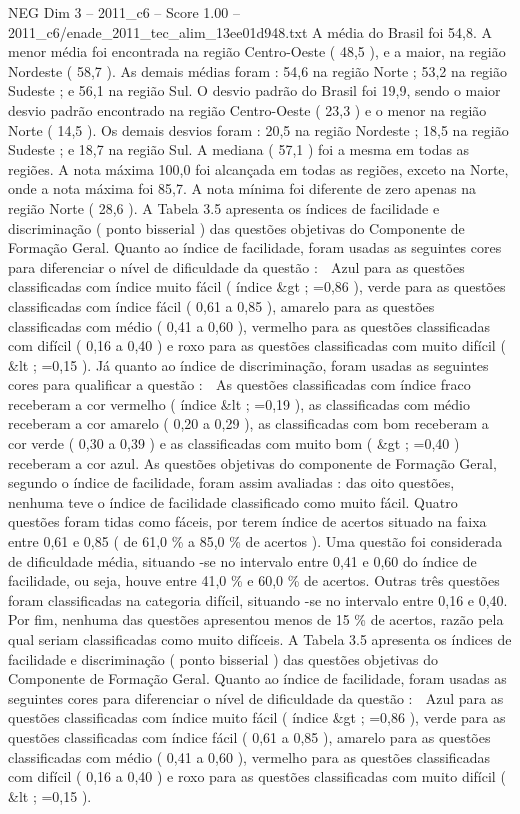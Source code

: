 \begin{textsample}{NEG Dim 3 – 2011\_c6 – Score 1.00 – 2011\_c6/enade\_2011\_tec\_alim\_13ee01d948.txt}
A média do Brasil foi 54,8.
A menor média foi encontrada na região Centro-Oeste ( 48,5 ), e a maior, na região Nordeste ( 58,7 ).
As demais médias foram : 54,6 na região Norte ; 53,2 na região Sudeste ; e 56,1 na região Sul.
O desvio padrão do Brasil foi 19,9, sendo o maior desvio padrão encontrado na região Centro-Oeste ( 23,3 ) e o menor na região Norte ( 14,5 ).
Os demais desvios foram : 20,5 na região Nordeste ; 18,5 na região Sudeste ; e 18,7 na região Sul.
A mediana ( 57,1 ) foi a mesma em todas as regiões.
A nota máxima 100,0 foi alcançada em todas as regiões, exceto na Norte, onde a nota máxima foi 85,7.
A nota mínima foi diferente de zero apenas na região Norte ( 28,6 ).
A Tabela 3.5 apresenta os índices de facilidade e discriminação ( ponto bisserial ) das questões objetivas do Componente de Formação Geral.
Quanto ao índice de facilidade, foram usadas as seguintes cores para diferenciar o nível de dificuldade da questão :  Azul para as questões classificadas com índice muito fácil ( índice \&gt ; =0,86 ), verde para as questões classificadas com índice fácil ( 0,61 a 0,85 ), amarelo para as questões classificadas com médio ( 0,41 a 0,60 ), vermelho para as questões classificadas com difícil ( 0,16 a 0,40 ) e roxo para as questões classificadas com muito difícil ( \&lt ; =0,15 ).
Já quanto ao índice de discriminação, foram usadas as seguintes cores para qualificar a questão :  As questões classificadas com índice fraco receberam a cor vermelho ( índice \&lt ; =0,19 ), as classificadas com médio receberam a cor amarelo ( 0,20 a 0,29 ), as classificadas com bom receberam a cor verde ( 0,30 a 0,39 ) e as classificadas com muito bom ( \&gt ; =0,40 ) receberam a cor azul.
As questões objetivas do componente de Formação Geral, segundo o índice de facilidade, foram assim avaliadas : das oito questões, nenhuma teve o índice de facilidade classificado como muito fácil.
Quatro questões foram tidas como fáceis, por terem índice de acertos situado na faixa entre 0,61 e 0,85 ( de 61,0 \% a 85,0 \% de acertos ).
Uma questão foi considerada de dificuldade média, situando -se no intervalo entre 0,41 e 0,60 do índice de facilidade, ou seja, houve entre 41,0 \% e 60,0 \% de acertos.
Outras três questões foram classificadas na categoria difícil, situando -se no intervalo entre 0,16 e 0,40.
Por fim, nenhuma das questões apresentou menos de 15 \% de acertos, razão pela qual seriam classificadas como muito difíceis.
A Tabela 3.5 apresenta os índices de facilidade e discriminação ( ponto bisserial ) das questões objetivas do Componente de Formação Geral.
Quanto ao índice de facilidade, foram usadas as seguintes cores para diferenciar o nível de dificuldade da questão :  Azul para as questões classificadas com índice muito fácil ( índice \&gt ; =0,86 ), verde para as questões classificadas com índice fácil ( 0,61 a 0,85 ), amarelo para as questões classificadas com médio ( 0,41 a 0,60 ), vermelho para as questões classificadas com difícil ( 0,16 a 0,40 ) e roxo para as questões classificadas com muito difícil ( \&lt ; =0,15 ).

\end{textsample}
